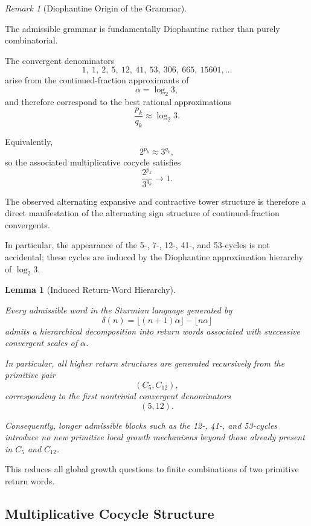 \documentclass[12pt, oneside]{article}
\numberwithin{equation}{section}
\theoremstyle{definition}
\theoremstyle{plain}
\newtheorem{lemma}[theorem]{Lemma}
\theoremstyle{remark}
\newtheorem*{remark}{Remark}
\begin{document}
\begin{remark}[Diophantine Origin of the Grammar]
\label{rem:diophantine-grammar}

The admissible grammar is fundamentally Diophantine rather than
purely combinatorial.

The convergent denominators
\[
1,\ 1,\ 2,\ 5,\ 12,\ 41,\ 53,\ 306,\ 665,\ 15601,\ldots
\]
arise from the continued-fraction approximants of
\[
\alpha=\log_2 3,
\]
and therefore correspond to the best rational approximations
\[
\frac{p_k}{q_k}\approx \log_2 3.
\]

Equivalently,
\[
2^{p_k}\approx 3^{q_k},
\]
so the associated multiplicative cocycle satisfies
\[
\frac{2^{p_k}}{3^{q_k}}\to1.
\]

The observed alternating expansive and contractive tower structure is
therefore a direct manifestation of the alternating sign structure of
continued-fraction convergents.

In particular, the appearance of the 5-, 7-, 12-, 41-, and 53-cycles
is not accidental; these cycles are induced by the Diophantine
approximation hierarchy of $\log_2 3$.
\end{remark}

\begin{lemma}[Induced Return-Word Hierarchy]
\label{lem:induced-hierarchy}

Every admissible word in the Sturmian language generated by
\[
\delta(n)=\lfloor (n+1)\alpha\rfloor-\lfloor n\alpha\rfloor
\]
admits a hierarchical decomposition into return words associated with
successive convergent scales of $\alpha$.

In particular, all higher return structures are generated recursively
from the primitive pair
\[
(C_5,C_{12}),
\]
corresponding to the first nontrivial convergent denominators
\[
(5,12).
\]

Consequently, longer admissible blocks such as the
12-, 41-, and 53-cycles introduce no new primitive local growth
mechanisms beyond those already present in $C_5$ and $C_{12}$.
\end{lemma}

\noindent
This reduces all global growth questions to finite combinations of two primitive return words.


\subsection{Multiplicative Cocycle Structure}
\end{document}
